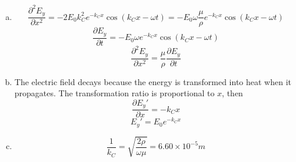 \documentclass{article}
\begin{document}
\section{}
\begin{enumerate}[(a)]
\item
$$\frac{\partial^2E_y}{\partial x^2}=-2E_0k_C^2e^{-k_Cx}\cos(k_Cx-\omega t)=-E_0\omega\frac{\mu}{\rho}e^{-k_Cx}\cos(k_Cx-\omega t)$$
$$\frac{\partial E_y}{\partial t}=-E_0\omega e^{-k_Cx}\cos(k_Cx-\omega t)$$
$$\frac{\partial^2E_y}{\partial x^2}=\frac{\mu}{\rho}\frac{\partial E_y}{\partial t}$$
\item
The electric field decays because the energy is transformed into heat when it propagates. The transformation ratio is proportional to $x$, then
$$\frac{\partial E_y'}{\partial x}=-k_Cx$$
$$E_y'=E_0e^{-k_Cx}$$
\item
$$\frac{1}{k_C}=\sqrt{\frac{2\rho}{\omega\mu}}=6.60\times10^{-5}m$$
\end{enumerate}
\end{document}

